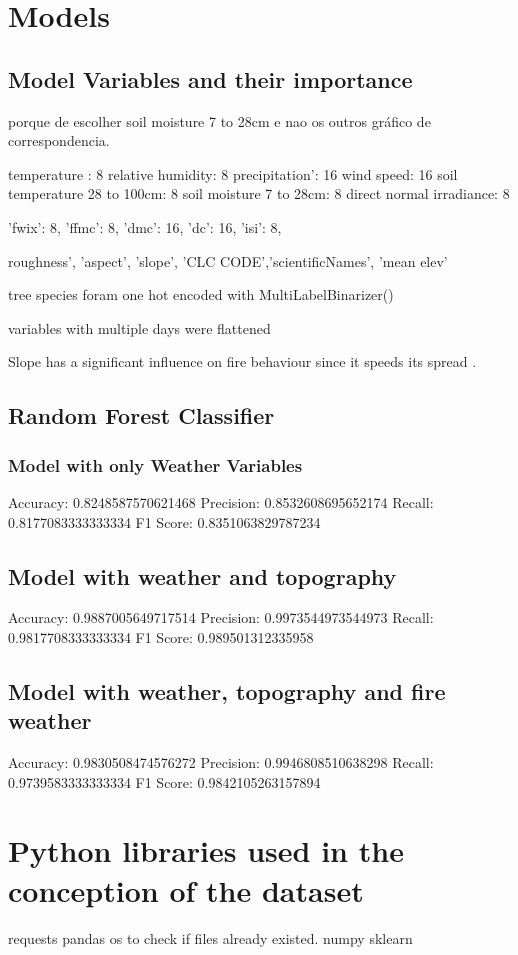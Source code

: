 \section{Models}


\subsection{Model Variables and their importance}

porque de escolher soil moisture 7 to 28cm e nao os outros gráfico de correspondencia.

temperature : 8
relative humidity: 8
precipitation': 16
wind speed: 16
soil temperature 28 to 100cm: 8
soil moisture 7 to 28cm: 8
direct normal irradiance: 8

'fwix': 8,
'ffmc': 8,
'dmc': 16,
'dc': 16,
'isi': 8,

roughness', 'aspect', 'slope', 'CLC CODE','scientificNames', 'mean elev'

tree species foram one hot encoded with MultiLabelBinarizer()

variables with multiple days were flattened

Slope has a significant influence on fire behaviour since it speeds its spread \cite{Marques2011}.


\subsection{Random Forest Classifier}



\subsubsection{Model with only Weather Variables}

Accuracy: 0.8248587570621468
Precision: 0.8532608695652174
Recall: 0.8177083333333334
F1 Score: 0.8351063829787234


\subsection{Model with weather and topography}

Accuracy: 0.9887005649717514
Precision: 0.9973544973544973
Recall: 0.9817708333333334
F1 Score: 0.989501312335958

\subsection{Model with weather, topography and fire weather}

Accuracy: 0.9830508474576272
Precision: 0.9946808510638298
Recall: 0.9739583333333334
F1 Score: 0.9842105263157894


\section{Python libraries used in the conception of the dataset}
requests
pandas
os to check if files already existed.
numpy
sklearn